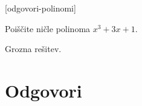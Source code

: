 
[odgovori-polinomi]

\begin{vaja}
  Poiščite ničle polinoma $x^3 + 3 x + 1$.

  \begin{odgovor}
    Grozna rešitev.
  \end{odgovor}
\end{vaja}



\section{Odgovori}
\label{sec:polinomi-odgovori}




